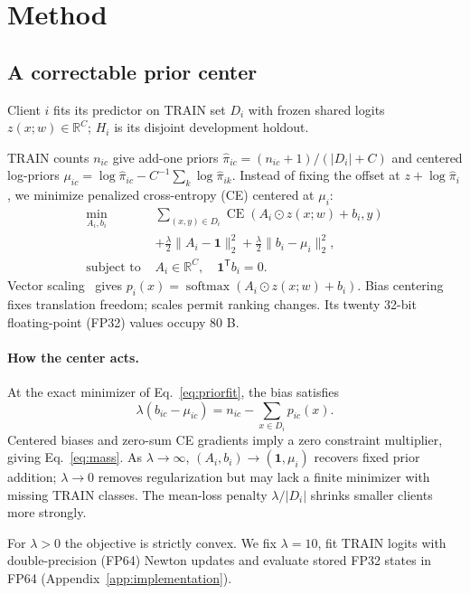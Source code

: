 \section{Method}

\subsection{A correctable prior center}
Client $i$ fits its predictor on TRAIN set $D_i$ with frozen shared logits $z(x;w)\in\mathbb{R}^C$; $H_i$ is its disjoint development holdout.

TRAIN counts $n_{ic}$ give add-one priors $\widehat\pi_{ic}=(n_{ic}+1)/(|D_i|+C)$ and centered log-priors $\mu_{ic}=\log\widehat\pi_{ic}-C^{-1}\sum_k\log\widehat\pi_{ik}$.
Instead of fixing the offset at $z+\log\widehat\pi_i$, we minimize penalized cross-entropy (CE) centered at $\mu_i$:
\begin{equation}\label{eq:priorfit}
\begin{aligned}
\min_{A_i,b_i}\;&\sum_{(x,y)\in D_i}\operatorname{CE}(A_i\odot z(x;w)+b_i,y)\\
&+\frac{\lambda}{2}\|A_i-\mathbf{1}\|_2^2
 +\frac{\lambda}{2}\|b_i-\mu_i\|_2^2,\\
\text{subject to }&A_i\in\mathbb{R}^C,\quad\mathbf{1}^{\mathsf T}b_i=0.
\end{aligned}
\end{equation}
Vector scaling~\cite{guo2017calibration} gives $p_i(x)=\operatorname{softmax}(A_i\odot z(x;w)+b_i)$. Bias centering fixes translation freedom; scales permit ranking changes. Its twenty 32-bit floating-point (FP32) values occupy 80 B.

\paragraph{How the center acts.}
At the exact minimizer of Eq.~\ref{eq:priorfit}, the bias satisfies
\begin{equation}\label{eq:mass}
\lambda(b_{ic}-\mu_{ic})
=n_{ic}-\sum_{x\in D_i}p_{ic}(x).
\end{equation}
Centered biases and zero-sum CE gradients imply a zero constraint multiplier, giving Eq.~\ref{eq:mass}. As $\lambda\to\infty$, $(A_i,b_i)\to(\mathbf{1},\mu_i)$ recovers fixed prior addition; $\lambda\to0$ removes regularization but may lack a finite minimizer with missing TRAIN classes. The mean-loss penalty $\lambda/|D_i|$ shrinks smaller clients more strongly.

For $\lambda>0$ the objective is strictly convex. We fix $\lambda=10$, fit TRAIN logits with double-precision (FP64) Newton updates and evaluate stored FP32 states in FP64 (Appendix~\ref{app:implementation}).

